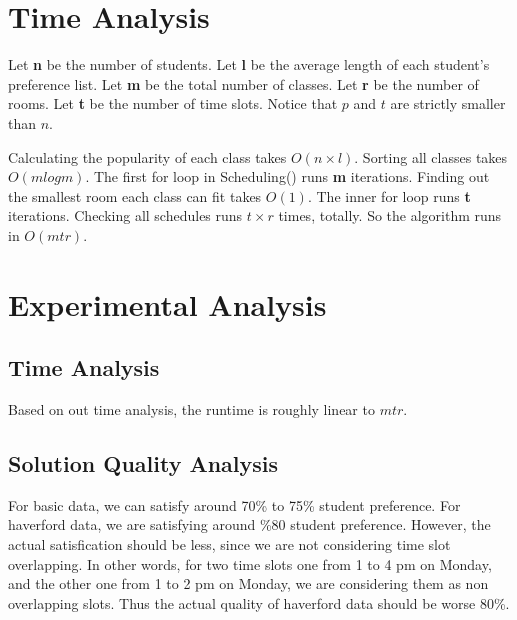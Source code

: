 \documentclass[11pt, oneside]{article}   	%
\begin{document}
\begin{algorithm}[H]

\end{algorithm}
\section{Time Analysis}
Let \textbf{n} be the number of students. 
Let \textbf{l} be the average length of each student's preference list.
Let \textbf{m} be the total number of classes. 
Let \textbf{r} be the number of rooms. 
Let \textbf{t} be the number of time slots. 
Notice that $p$ and $t$ are strictly smaller than $n$.

Calculating the popularity of each class takes $O(n\times l)$. Sorting all classes takes $O(mlogm)$. The first for loop in Scheduling() runs \textbf{m} iterations. Finding out the smallest room each class can fit takes $O(1)$. The inner for loop runs \textbf{t} iterations. Checking all schedules runs $t \times r$ times, totally. So the algorithm runs in $O(mtr)$.

\section{Experimental Analysis}
\subsection{Time Analysis}
Based on out time analysis, the runtime is roughly linear to $mtr$.

\subsection{Solution Quality Analysis}
For basic data, we can satisfy around 70\% to 75\% student preference. For haverford data, we are satisfying around \%80 student preference. However, the actual satisfication should be less, since we are not considering time slot overlapping. In other words, for two time slots one from 1 to 4 pm on Monday, and the other one from 1 to 2 pm on Monday, we are considering them as non overlapping slots. Thus the actual quality of haverford data should be worse 80\%.
\end{document}
